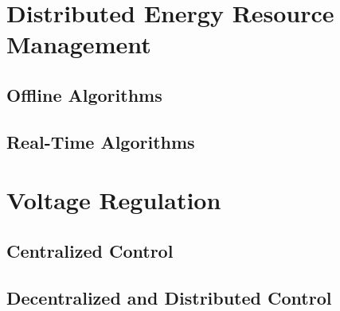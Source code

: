 \section{Distributed Energy Resource Management}
\subsection{Offline Algorithms}
\subsection{Real-Time Algorithms}

\section{Voltage Regulation}
\subsection{Centralized Control}
\subsection{Decentralized and Distributed Control}

